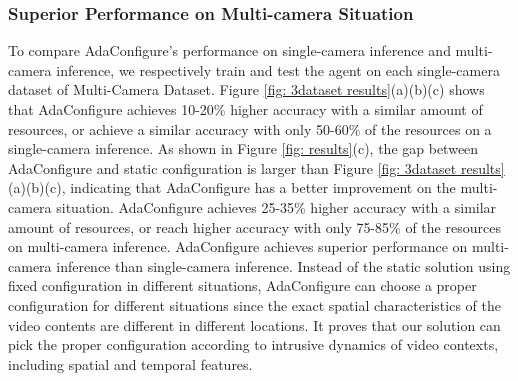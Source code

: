 \subsubsection{Superior Performance on Multi-camera Situation}
\label{subsec: superior performance}

To compare AdaConfigure's performance on single-camera inference and multi-camera inference, we respectively train and test the agent on each single-camera dataset of Multi-Camera Dataset. Figure \ref{fig: 3dataset results}(a)(b)(c) shows that AdaConfigure achieves 10-20\% higher accuracy with a similar amount of resources, or achieve a similar accuracy with only 50-60\% of the resources on a single-camera inference.  As shown in Figure \ref{fig: results}(c), the gap between AdaConfigure and static configuration is larger than Figure \ref{fig: 3dataset results}(a)(b)(c), indicating that AdaConfigure has a better improvement on the multi-camera situation. AdaConfigure achieves 25-35\% higher accuracy with a similar amount of resources, or reach higher accuracy with only 75-85\% of the resources on multi-camera inference. AdaConfigure achieves superior performance on multi-camera inference than single-camera inference. Instead of the static solution using fixed configuration in different situations, AdaConfigure can choose a proper configuration for different situations since the exact spatial characteristics of the video contents are different in different locations. It proves that our solution can pick the proper configuration according to intrusive dynamics of video contexts, including spatial and temporal features.


